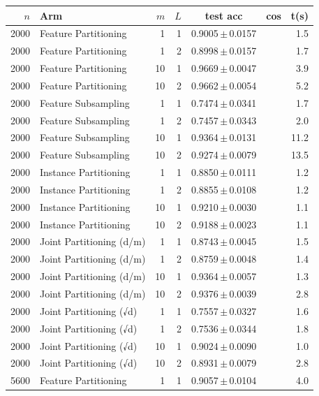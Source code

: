 \begin{table}[ht]
\centering\small
\begin{tabular}{rlrrccr}
\toprule
$n$ & Arm & $m$ & $L$ & test acc & cos & t(s) \\
\midrule
2000 & Feature Partitioning & 1 & 1 & 0.9005\,$\pm$\,0.0157 &  & 1.5 \\
2000 & Feature Partitioning & 1 & 2 & 0.8998\,$\pm$\,0.0157 &  & 1.7 \\
2000 & Feature Partitioning & 10 & 1 & 0.9669\,$\pm$\,0.0047 &  & 3.9 \\
2000 & Feature Partitioning & 10 & 2 & 0.9662\,$\pm$\,0.0054 &  & 5.2 \\
2000 & Feature Subsampling & 1 & 1 & 0.7474\,$\pm$\,0.0341 &  & 1.7 \\
2000 & Feature Subsampling & 1 & 2 & 0.7457\,$\pm$\,0.0343 &  & 2.0 \\
2000 & Feature Subsampling & 10 & 1 & 0.9364\,$\pm$\,0.0131 &  & 11.2 \\
2000 & Feature Subsampling & 10 & 2 & 0.9274\,$\pm$\,0.0079 &  & 13.5 \\
2000 & Instance Partitioning & 1 & 1 & 0.8850\,$\pm$\,0.0111 &  & 1.2 \\
2000 & Instance Partitioning & 1 & 2 & 0.8855\,$\pm$\,0.0108 &  & 1.2 \\
2000 & Instance Partitioning & 10 & 1 & 0.9210\,$\pm$\,0.0030 &  & 1.1 \\
2000 & Instance Partitioning & 10 & 2 & 0.9188\,$\pm$\,0.0023 &  & 1.1 \\
2000 & Joint Partitioning (d/m) & 1 & 1 & 0.8743\,$\pm$\,0.0045 &  & 1.5 \\
2000 & Joint Partitioning (d/m) & 1 & 2 & 0.8759\,$\pm$\,0.0048 &  & 1.4 \\
2000 & Joint Partitioning (d/m) & 10 & 1 & 0.9364\,$\pm$\,0.0057 &  & 1.3 \\
2000 & Joint Partitioning (d/m) & 10 & 2 & 0.9376\,$\pm$\,0.0039 &  & 2.8 \\
2000 & Joint Partitioning (√d) & 1 & 1 & 0.7557\,$\pm$\,0.0327 &  & 1.6 \\
2000 & Joint Partitioning (√d) & 1 & 2 & 0.7536\,$\pm$\,0.0344 &  & 1.8 \\
2000 & Joint Partitioning (√d) & 10 & 1 & 0.9024\,$\pm$\,0.0090 &  & 1.0 \\
2000 & Joint Partitioning (√d) & 10 & 2 & 0.8931\,$\pm$\,0.0079 &  & 2.8 \\
5600 & Feature Partitioning & 1 & 1 & 0.9057\,$\pm$\,0.0104 &  & 4.0 \\

\end{tabular}
\end{table}
